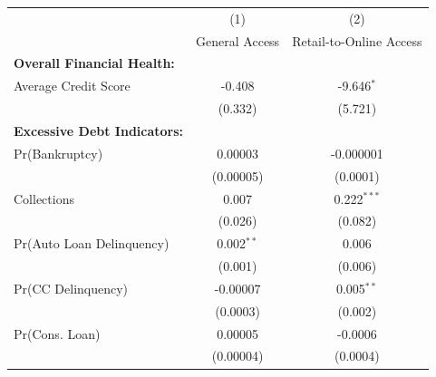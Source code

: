 \begin{tabular}{@{\extracolsep{5pt}} lcc} 
\toprule
\midrule
 & (1) & (2) \\
   & General Access  & Retail-to-Online Access  \\ 
\midrule
\textbf{Overall Financial Health:}  &  &  \\ 

 \enspace Average Credit Score & -0.408 & -9.646$^{*}$ \\ 
  & (0.332) & (5.721) \\ 
  \addlinespace

   \textbf{Excessive Debt Indicators:}   & &  \\ 
   
\enspace  Pr(Bankruptcy) & 0.00003 & -0.000001 \\ 
  & (0.00005) & (0.0001) \\ 
  \addlinespace
 \enspace Collections & 0.007 & 0.222$^{***}$ \\ 
  & (0.026) & (0.082) \\ 
  \addlinespace
 \enspace Pr(Auto Loan Delinquency) & 0.002$^{**}$ & 0.006 \\ 
  & (0.001) & (0.006) \\ 
  \addlinespace
 \enspace Pr(CC Delinquency) & -0.00007 & 0.005$^{**}$ \\ 
  & (0.0003) & (0.002) \\ 
  \addlinespace
\enspace Pr(Cons. Loan) & 0.00005 & -0.0006 \\ 
  & (0.00004) & (0.0004) \\ 
\bottomrule
\end{tabular}